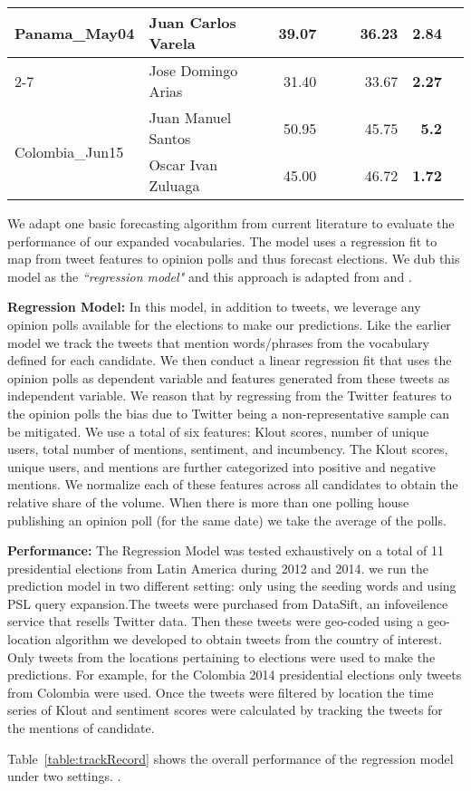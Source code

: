 \begin{table*}[ht]
\begin{tabular}{| l | l | r | r | r | r | r | r |}
		\hline
		\multirow{2}{*}{Panama\_May04} & Juan Carlos Varela & 39.07 &  &  &36.23  & \textbf{2.84}\\\cline{2-7}
																	& Jose Domingo Arias  & 31.40 &  &  &33.67  & \textbf{2.27} \\
		\hline 											 
		\multirow{2}{*}{Colombia\_Jun15} & Juan Manuel Santos & 50.95 &  &  & 45.75 & \textbf{5.2}\\\cline{2-7}
																	& Oscar Ivan Zuluaga & 45.00 &  &  &46.72  & \textbf{1.72} \\
		\hline
		\end{tabular}
		\caption{Reduction in prediction error for Regression Model. All values shown are percentages.}
		\label{table:trackRecord}
	\end{table*}	

We adapt one basic forecasting algorithm from current literature to evaluate the
performance of our expanded vocabularies. The model uses a regression fit to map from tweet features to opinion polls and thus forecast elections. We dub this model as the \emph{``regression model"} and this approach is adapted from \cite{bermingham2011using} and \cite{o2010tweets}.

{\bf Regression Model:}
In this model, in addition to tweets, we leverage any opinion polls available for the elections 
to make our predictions.
Like the earlier model we track the tweets that mention words/phrases
from the vocabulary defined for each candidate.
We then conduct a linear regression fit that uses the opinion polls as dependent variable and features generated from 
these tweets as independent variable.
We reason that by regressing from the Twitter features to the opinion polls the bias due to Twitter being a non-representative sample
can be mitigated.
We use a total of six features: Klout scores, number of unique users, total number of mentions, sentiment, and incumbency.
The Klout scores, unique users, and mentions are further categorized into positive and negative mentions.
We normalize each of these features across all candidates to obtain the relative share of the volume. 
When there is more than one polling house publishing an opinion poll (for the same date) we take the average of the polls. 

\noindent
{\bf Performance:}
The Regression Model was tested exhaustively on a total of 11 presidential elections from Latin America during 2012 and 2014. we run the prediction model in two different setting: only using the seeding words and using PSL query expansion.The tweets were purchased from DataSift, an infoveilence service that resells Twitter data. Then these tweets were geo-coded using a geo-location algorithm we developed to obtain tweets from the country of interest.
Only tweets from the locations pertaining to elections were used to make the predictions.
For example, for the Colombia 2014 presidential elections only tweets from Colombia were used.
Once the tweets were filtered by location the time series of Klout and sentiment scores were calculated by tracking the tweets for the mentions of candidate.

Table~\ref{table:trackRecord} shows the overall performance of the regression model under two settings. 
.
